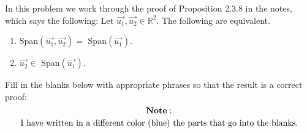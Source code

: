 \documentclass[12pt]{article}
\newenvironment{problem}[2][Problem]
{
	\begin{trivlist} 
		\item[\hskip \labelsep {\bfseries #1 #2:}]
	}
{
	\end{trivlist}
	}
\begin{document}
\newpage
\begin{problem}{4}
In this problem we work through the proof of Proposition 2.3.8 in the notes, which says the following: Let $\vec{u_{1}}, \vec{u_{2}} \in \mathbb{R}^2$. The following are equivalent.
\begin{enumerate}
\item Span$(\vec{u_{1}}, \vec{u_{2}}) =$ Span$(\vec{u_{1}})$.
\item $\vec{u_{2}} \in$ Span$(\vec{u_{1}})$.
\end{enumerate}
Fill in the blanks below with appropriate phrases so that the result is a correct proof:
\[
{\bf Note:}
\]
\[
\text{I have written in a different
color (blue) %
the parts that go into the blanks.}
\]


\end{problem}
\end{document}

